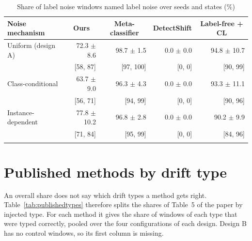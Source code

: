 \documentclass[pdflatex,sn-basic]{sn-jnl}
\begin{document}
\begin{table}[!htbp]\centering\tablebodyfont
\caption{Share of label noise windows named label noise over seeds and states (\%)}\label{tab:seedsnoise}%
\begin{tabular}{@{}lrrrr@{}}
\toprule
Noise mechanism & \multicolumn{1}{c}{Ours} & \multicolumn{1}{c}{Meta-classifier} & \multicolumn{1}{c}{DetectShift} & \multicolumn{1}{c}{Label-free + CL} \\
\midrule
Uniform (design A) & 72.3 $\pm$ 8.6 & 98.7 $\pm$ 1.5 & 0.0 $\pm$ 0.0 & 94.8 $\pm$ 10.7 \\
 & [58, 87] & [97, 100] & [0, 0] & [90, 99] \\
Class-conditional & 63.7 $\pm$ 9.0 & 96.3 $\pm$ 4.3 & 0.0 $\pm$ 0.0 & 93.3 $\pm$ 11.1 \\
 & [56, 71] & [94, 99] & [0, 0] & [90, 96] \\
Instance-dependent & 77.8 $\pm$ 10.2 & 96.8 $\pm$ 2.8 & 0.0 $\pm$ 0.0 & 90.2 $\pm$ 9.9 \\
 & [71, 84] & [95, 99] & [0, 0] & [84, 96] \\
\botrule
\end{tabular}
\end{table}

\FloatBarrier

\section{Published methods by drift type}\label{sec:pubtypes}

An overall share does not say which drift types a method gets right. Table~\ref{tab:publishedtypes} therefore splits the shares of Table~5 of the paper by injected type. For each method it gives the share of windows of each type that were typed correctly, pooled over the four configurations of each design. Design B has no control windows, so its first column is missing.
\end{document}
